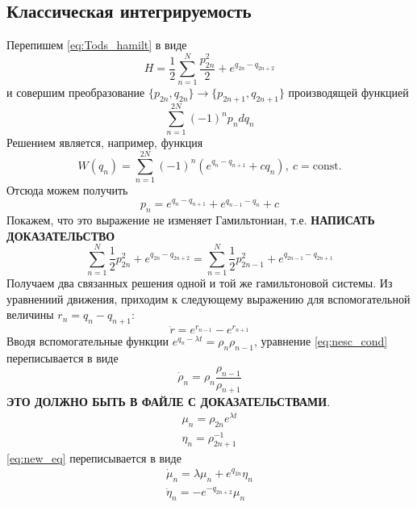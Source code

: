 \documentclass[12pt]{article}
\begin{document}
\subsection{Классическая интегрируемость}
Перепишем \eqref{eq:Tods_hamilt} в виде 
\begin{equation}
    H = \frac{1}{2} \sum_{n = 1}^{N} \frac{p^2_{2n}}{2} + e^{q_{2n} - q_{2n + 2}}
\end{equation}
и совершим преобразование $\{ p_{2n}, q_{2n}\} \rightarrow \{ p_{2n + 1}, q_{2n+1}\} $ производящей функцией 
\begin{equation}
    \sum^{2N}_{n = 1} (-1)^n p_n dq_n
\end{equation}
Решением является, например, функция 
\begin{equation}
    W(q_n) = \sum_{n = 1}^{2N} (-1)^n (e^{q_n - q_{n + 1}} + c q_n), \ c = \text{const}.
\end{equation}
Отсюда можем получить 
\begin{equation}
    p_n = e^{q_n - q_{n+1}} + e^{q_{n-1} - q_n} + c
\end{equation}
Покажем, что это выражение не изменяет Гамильтониан, т.е. \textbf{НАПИСАТЬ ДОКАЗАТЕЛЬСТВО}
\begin{equation}
    \sum_{n = 1}^N \frac{1}{2}p_{2n}^2 + e^{q_{2n} - q_{2n + 2}} = \sum_{n = 1}^{N} \frac{1}{2}p_{2n-1}^2 + e^{q_{2n-1} - q_{2n + 1}}
\end{equation}
Получаем два связанных решения одной и той же гамильтоновой системы. Из уравнениий движения, приходим к следующему выражению 
для вспомогательной величины $r_n = q_n - q_{n+1}$:
\begin{equation}\label{eq:nesc_cond}
    \dot{r} = e^{r_{n - 1}} - e^{r_{n+1}}
\end{equation}
Вводя вспомогательные функции $e^{q_n - \lambda t} = \rho_n \rho_{n-1}$, уравнение \eqref{eq:nesc_cond} переписывается в виде
\begin{equation}\label{eq:new_eq}
    \dot{\rho}_n = \rho_n \frac{\rho_{n-1}}{\rho_{n+1}}
\end{equation}
\textbf{ЭТО ДОЛЖНО БЫТЬ В ФАЙЛЕ С ДОКАЗАТЕЛЬСТВАМИ}. 
\begin{equation}
    \begin{array}{l}
        \mu_n = \rho_{2n}e^{\lambda t} \\
        \eta_n = \rho^{-1}_{2n + 1}
    \end{array}
\end{equation}
\eqref{eq:new_eq} переписывается в виде 
\begin{equation}
    \begin{array}{l}
        \dot{\mu}_n = \lambda \mu_n + e^{q_{2n}}\eta_n \\
        \dot{\eta}_n = - e^{-q_{2n + 2}}\mu_n
    \end{array}
\end{equation}
\end{document}
